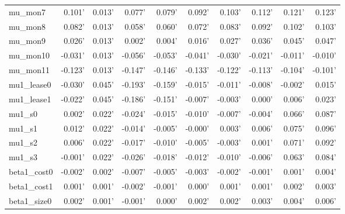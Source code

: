 \begin{tabular}{lrrrrrrrrr}
mu\_mon7      &  0.101' & 0.013' &  0.077' &  0.079' &  0.092' &  0.103' &  0.112' &  0.121' &  0.123' \\
mu\_mon8      &  0.082' & 0.013' &  0.058' &  0.060' &  0.072' &  0.083' &  0.092' &  0.102' &  0.103' \\
mu\_mon9      &  0.026' & 0.013' &  0.002' &  0.004' &  0.016' &  0.027' &  0.036' &  0.045' &  0.047' \\
mu\_mon10     & -0.031' & 0.013' & -0.056' & -0.053' & -0.041' & -0.030' & -0.021' & -0.011' & -0.010' \\
mu\_mon11     & -0.123' & 0.013' & -0.147' & -0.146' & -0.133' & -0.122' & -0.113' & -0.104' & -0.101' \\
mu1\_lease0   & -0.030' & 0.045' & -0.193' & -0.159' & -0.015' & -0.011' & -0.008' & -0.002' &  0.015' \\
mu1\_lease1   & -0.022' & 0.045' & -0.186' & -0.151' & -0.007' & -0.003' &  0.000' &  0.006' &  0.023' \\
mu1\_s0       &  0.002' & 0.022' & -0.024' & -0.015' & -0.010' & -0.007' & -0.004' &  0.066' &  0.087' \\
mu1\_s1       &  0.012' & 0.022' & -0.014' & -0.005' & -0.000' &  0.003' &  0.006' &  0.075' &  0.096' \\
mu1\_s2       &  0.006' & 0.022' & -0.017' & -0.010' & -0.005' & -0.003' &  0.001' &  0.071' &  0.092' \\
mu1\_s3       & -0.001' & 0.022' & -0.026' & -0.018' & -0.012' & -0.010' & -0.006' &  0.063' &  0.084' \\
beta1\_cost0  & -0.002' & 0.002' & -0.007' & -0.005' & -0.003' & -0.002' & -0.001' &  0.001' &  0.004' \\
beta1\_cost1  &  0.001' & 0.001' & -0.002' & -0.001' &  0.000' &  0.001' &  0.001' &  0.002' &  0.003' \\
beta1\_size0  &  0.002' & 0.001' & -0.001' &  0.000' &  0.002' &  0.002' &  0.003' &  0.004' &  0.006' \\
\bottomrule
\end{tabular}
